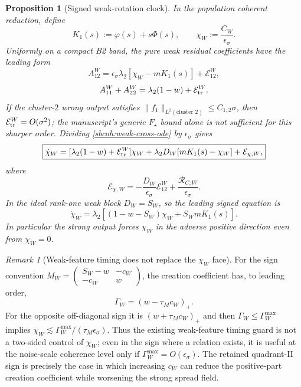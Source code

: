 \documentclass{article} %
\theoremstyle{plain}
\newtheorem{proposition}[theorem]{Proposition}
\theoremstyle{definition}
\theoremstyle{remark}
\newtheorem{remark}[theorem]{Remark}
\begin{document}
\begin{proposition}[Signed weak-rotation clock]
\label{sbcoh:weak-rotation}
In the population coherent reduction, define
\[
 K_1(s):=\varphi(s)+s\Phi(s),
 \qquad
 \chi_W:=\frac{C_W}{\epsilon_\sigma}.
\]
Uniformly on a compact B2 band, the pure weak residual coefficients have the
leading form
\begin{equation}\label{sbcoh:weak-A12-pop}
 A_{12}^W
 =\epsilon_\sigma\lambda_2[\chi_W-mK_1(s)]
 +\mathcal E_{12}^W,
\end{equation}
\begin{equation}\label{sbcoh:weak-trace-pop}
 A_{11}^W+A_{22}^W
 =\lambda_2(1-w)+\mathcal E_{\rm tr}^W.
\end{equation}
If the cluster-$2$ wrong output satisfies
$\|f_1\|_{L^2(\text{cluster }2)}\le C_{1,2}\sigma$, then
$\mathcal E_{\rm tr}^W=O(\sigma^2)$; the manuscript's generic
$F_\star$ bound alone is not sufficient for this sharper order.
Dividing \eqref{sbcoh:weak-cross-ode} by $\epsilon_\sigma$ gives
\begin{equation}\label{sbcoh:chi-exact-interface}
 \boxed{
 \dot\chi_W
 =[\lambda_2(1-w)+\mathcal E_{\rm tr}^W]\chi_W
 +\lambda_2D_W[mK_1(s)-\chi_W]
 +\mathcal E_{\chi,W},
 }
\end{equation}
where
\[
 \mathcal E_{\chi,W}
 =-\frac{D_W}{\epsilon_\sigma}\mathcal E_{12}^W
  +\frac{\mathcal R_{C,W}}{\epsilon_\sigma}.
\]
In the ideal rank-one weak block $D_W=S_W$, so the leading signed equation is
\begin{equation}\label{sbcoh:chi-leading}
 \boxed{
 \dot\chi_W
 =\lambda_2[(1-w-S_W)\chi_W+S_WmK_1(s)].
 }
\end{equation}
In particular the strong output forces $\chi_W$ in the adverse positive
direction even from $\chi_W=0$.
\end{proposition}

\begin{remark}[Weak-feature timing does not replace the $\chi_W$ face]
\label{sbcoh:gamma-vs-chi}
For the sign convention
$M_W=\left(\begin{smallmatrix}S_W-w&-c_W\\-c_W&w\end{smallmatrix}\right)$,
the creation coefficient has, to leading order,
\[
 \Gamma_W=(w-\tau_Mc_W)_+.
\]
For the opposite off-diagonal sign it is
$(w+\tau_Mc_W)_+$ and then
$\Gamma_W\le\Gamma_W^{\max}$ implies
$\chi_W\lesssim\Gamma_W^{\max}/(\tau_M\epsilon_\sigma)$.
Thus the existing weak-feature timing guard is not a two-sided control of
$\chi_W$; even in the sign where a relation exists, it is useful at the
noise-scale coherence level only if $\Gamma_W^{\max}=O(\epsilon_\sigma)$.
The retained quadrant-II sign is precisely the case in which increasing
$c_W$ can reduce the positive-part creation coefficient while worsening the
strong spread field.
\end{remark}
\end{document}
